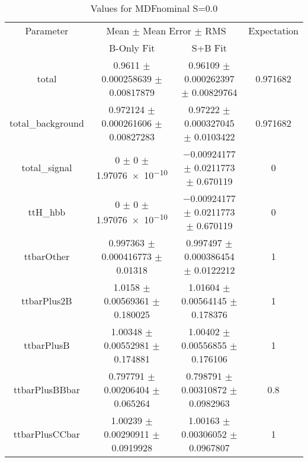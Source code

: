 \begin{table}
\centering
\caption{Values for MDFnominal S=0.0}
\begin{tabular}{cccc}
\toprule
Parameter & \multicolumn{2}{c}{Mean $\pm$ Mean Error $\pm$ RMS} & Expectation\\
 & B-Only Fit & S+B Fit & \\
\midrule
total & \num{0.9611} $\pm$ \num{0.000258639} $\pm$ \num{0.00817879} & \num{0.96109} $\pm$ \num{0.000262397} $\pm$ \num{0.00829764} & \num{0.971682}\\
total\_background & \num{0.972124} $\pm$ \num{0.000261606} $\pm$ \num{0.00827283} & \num{0.97222} $\pm$ \num{0.000327045} $\pm$ \num{0.0103422} & \num{0.971682}\\
total\_signal & \num{0} $\pm$ \num{0} $\pm$ \num{1.97076e-10} & \num{-0.00924177} $\pm$ \num{0.0211773} $\pm$ \num{0.670119} & \num{0}\\
ttH\_hbb & \num{0} $\pm$ \num{0} $\pm$ \num{1.97076e-10} & \num{-0.00924177} $\pm$ \num{0.0211773} $\pm$ \num{0.670119} & \num{0}\\
ttbarOther & \num{0.997363} $\pm$ \num{0.000416773} $\pm$ \num{0.01318} & \num{0.997497} $\pm$ \num{0.000386454} $\pm$ \num{0.0122212} & \num{1}\\
ttbarPlus2B & \num{1.0158} $\pm$ \num{0.00569361} $\pm$ \num{0.180025} & \num{1.01604} $\pm$ \num{0.00564145} $\pm$ \num{0.178376} & \num{1}\\
ttbarPlusB & \num{1.00348} $\pm$ \num{0.00552981} $\pm$ \num{0.174881} & \num{1.00402} $\pm$ \num{0.00556855} $\pm$ \num{0.176106} & \num{1}\\
ttbarPlusBBbar & \num{0.797791} $\pm$ \num{0.00206404} $\pm$ \num{0.065264} & \num{0.798791} $\pm$ \num{0.00310872} $\pm$ \num{0.0982963} & \num{0.8}\\
ttbarPlusCCbar & \num{1.00239} $\pm$ \num{0.00290911} $\pm$ \num{0.0919928} & \num{1.00163} $\pm$ \num{0.00306052} $\pm$ \num{0.0967807} & \num{1}\\
\bottomrule
\end{tabular}
\end{table}